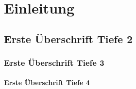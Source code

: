 \chapter{Einleitung}
\lipsum

\section{Erste Überschrift Tiefe 2}
\lipsum 

\subsection{Erste Überschrift Tiefe 3}
\lipsum 

\subsubsection{Erste Überschrift Tiefe 4}
\lipsum